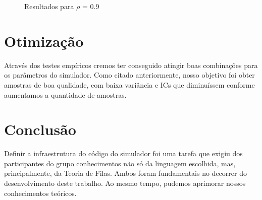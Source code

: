 \documentclass[a4paper,12pt]{report}
\begin{document}
\begin{figure}[htbp]
   \centering
   \caption{Resultados para $\rho$ = 0.9}
\end{figure}

\chapter{Otimização}
Através dos testes empíricos cremos ter conseguido atingir boas combinações para os parâmetros do simulador. Como citado anteriormente, nosso objetivo foi obter amostras de boa qualidade, com baixa variância e ICs que diminuíssem conforme aumentamos a quantidade de amostras.



\chapter{Conclusão}
Definir a infraestrutura do código do simulador foi uma tarefa que exigiu dos participantes do grupo conhecimentos não só da linguagem escolhida, mas, principalmente, da Teoria  de Filas. Ambos foram fundamentais no decorrer do desenvolvimento deste trabalho. Ao mesmo tempo, pudemos aprimorar nossos conhecimentos teóricos.
\end{document}
